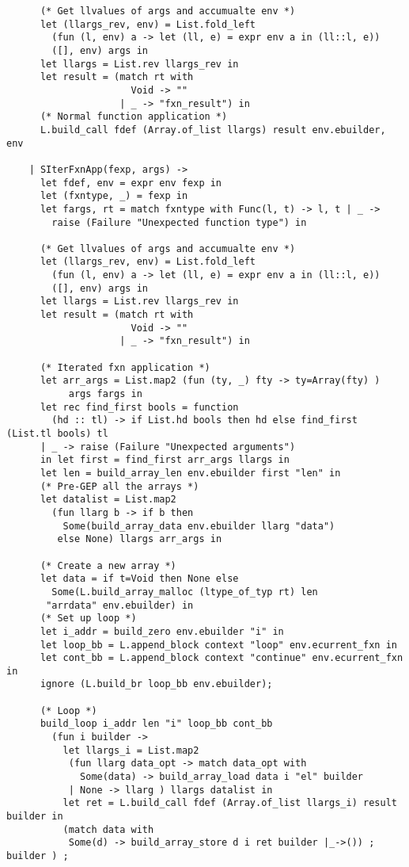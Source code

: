 \documentclass[main.tex]{subfiles}
\begin{document}
\begin{lstlisting}
      (* Get llvalues of args and accumualte env *)
      let (llargs_rev, env) = List.fold_left
        (fun (l, env) a -> let (ll, e) = expr env a in (ll::l, e))
        ([], env) args in
      let llargs = List.rev llargs_rev in
      let result = (match rt with
                      Void -> ""
                    | _ -> "fxn_result") in
      (* Normal function application *)
      L.build_call fdef (Array.of_list llargs) result env.ebuilder, env

    | SIterFxnApp(fexp, args) ->
      let fdef, env = expr env fexp in
      let (fxntype, _) = fexp in
      let fargs, rt = match fxntype with Func(l, t) -> l, t | _ -> 
        raise (Failure "Unexpected function type") in

      (* Get llvalues of args and accumualte env *)
      let (llargs_rev, env) = List.fold_left
        (fun (l, env) a -> let (ll, e) = expr env a in (ll::l, e))
        ([], env) args in
      let llargs = List.rev llargs_rev in
      let result = (match rt with
                      Void -> ""
                    | _ -> "fxn_result") in

      (* Iterated fxn application *)
      let arr_args = List.map2 (fun (ty, _) fty -> ty=Array(fty) )
           args fargs in
      let rec find_first bools = function 
        (hd :: tl) -> if List.hd bools then hd else find_first (List.tl bools) tl
      | _ -> raise (Failure "Unexpected arguments")
      in let first = find_first arr_args llargs in
      let len = build_array_len env.ebuilder first "len" in
      (* Pre-GEP all the arrays *)
      let datalist = List.map2
        (fun llarg b -> if b then 
          Some(build_array_data env.ebuilder llarg "data")
         else None) llargs arr_args in

      (* Create a new array *)
      let data = if t=Void then None else 
        Some(L.build_array_malloc (ltype_of_typ rt) len
       "arrdata" env.ebuilder) in
      (* Set up loop *)
      let i_addr = build_zero env.ebuilder "i" in
      let loop_bb = L.append_block context "loop" env.ecurrent_fxn in
      let cont_bb = L.append_block context "continue" env.ecurrent_fxn in
      ignore (L.build_br loop_bb env.ebuilder);

      (* Loop *)
      build_loop i_addr len "i" loop_bb cont_bb
        (fun i builder ->
          let llargs_i = List.map2
           (fun llarg data_opt -> match data_opt with
             Some(data) -> build_array_load data i "el" builder
           | None -> llarg ) llargs datalist in
          let ret = L.build_call fdef (Array.of_list llargs_i) result builder in
          (match data with 
           Some(d) -> build_array_store d i ret builder |_->()) ; builder ) ;    


\end{lstlisting}
\end{document}
